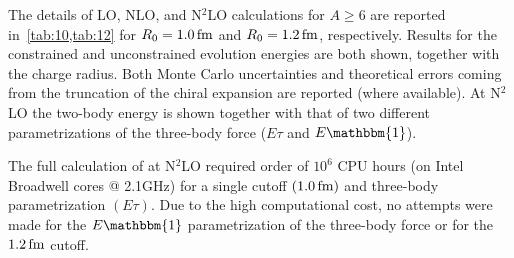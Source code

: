 \documentclass[aps,prc,twocolumn,superscriptaddress,floatfix]{revtex4-1}
\begin{document}
The details of LO, NLO, and N$^2$LO calculations for $A\ge6$ are reported in~\cref{tab:10,tab:12}
for $R_0=1.0\,\rm fm$ and $R_0=1.2\,\rm fm$, respectively. Results for the constrained and 
unconstrained evolution energies are both shown, together with the charge radius.
Both Monte Carlo uncertainties and theoretical errors coming from the truncation of the chiral 
expansion are reported (where available). At N$^2$LO the two-body energy is shown together with
that of two different parametrizations of the three-body force ($E\tau$ and $E\mathbbm{1}$).

The full calculation of  at N$^2$LO required 
order of $10^6$ CPU hours (on Intel Broadwell cores @ 2.1GHz) for a single cutoff $(1.0\,\rm fm)$ 
and three-body parametrization $(E\tau)$. Due to the high computational cost, no attempts were
made for the $E\mathbbm{1}$ parametrization of the three-body force or for the $1.2\,\rm fm$ cutoff.
\end{document}

